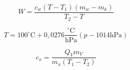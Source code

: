 \begin{equation}
    W=\frac{c_{w} \left(T - T_{1}\right) \left(  m_{w}- m_{k}\right)}{ T_{2}- T}
    \label{eq:Wasserwert}
\end{equation}

\begin{equation}
    T = 100^\circ \text{C} + 0,0276 \frac{^\circ \text{C}}{\text{hPa}}(p -1014 \text{hPa})
    \label{eq:Siedetemperatur}
\end{equation}

\begin{equation}
    c_x = \frac{Q_V m_V}{m_x(T_1-T_2)}
    \label{eq:cN}
\end{equation}
